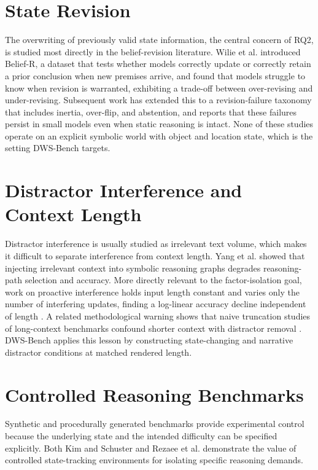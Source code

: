 \documentclass{iutbscthesis}
\begin{document}
\section{State Revision}
The overwriting of previously valid state information, the central concern of RQ2, is studied most
directly in the belief-revision literature. Wilie et al. \cite{wilie2024belief} introduced Belief-R, a
dataset that tests whether models correctly update or correctly retain a prior conclusion when new
premises arrive, and found that models struggle to know when revision is warranted, exhibiting a
trade-off between over-revising and under-revising. Subsequent work has extended this to a
revision-failure taxonomy that includes inertia, over-flip, and abstention, and reports that these
failures persist in small models even when static reasoning is intact. None of these studies operate
on an explicit symbolic world with object and location state, which is the setting DWS-Bench
targets.

\section{Distractor Interference and Context Length}
Distractor interference is usually studied as irrelevant text volume, which makes it difficult to
separate interference from context length. Yang et al. \cite{yang2025gsmdc} showed that injecting
irrelevant context into symbolic reasoning graphs degrades reasoning-path selection and accuracy.
More directly relevant to the factor-isolation goal, work on proactive interference holds input length
constant and varies only the number of interfering updates, finding a log-linear accuracy decline
independent of length \cite{unable2025forget}. A related methodological warning shows that naive
truncation studies of long-context benchmarks confound shorter context with distractor removal
\cite{distractor2026truncation}. DWS-Bench applies this lesson by constructing state-changing and
narrative distractor conditions at matched rendered length.

\section{Controlled Reasoning Benchmarks}
Synthetic and procedurally generated benchmarks provide experimental control because the underlying
state and the intended difficulty can be specified explicitly. Both Kim and Schuster \cite{kim2023entity}
and Rezaee et al. \cite{rezaee2025exploring} demonstrate the value of controlled state-tracking
environments for isolating specific reasoning demands.
\end{document}
